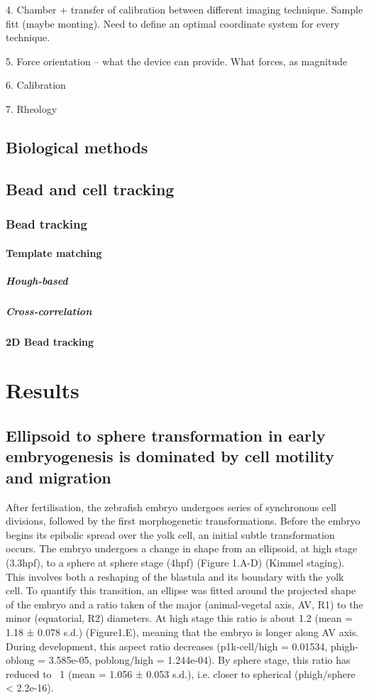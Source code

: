     4. Chamber + transfer of calibration between different imaging technique. Sample fitt (maybe monting). Need to define an optimal coordinate system for every technique.

    5. Force orientation – what the device can provide. What forces, as magnitude

    6. Calibration

    7. Rheology
  \fi
\subsection{Biological methods}
\subsection{Bead and cell tracking}
\subsubsection{Bead tracking}
\paragraph{Template matching}
\subparagraph{Hough-based}
\subparagraph{Cross-correlation}
\paragraph{2D Bead tracking}
\section{Results}

\subsection{Ellipsoid to sphere transformation in early embryogenesis is dominated by cell motility and migration}
After fertilisation, the zebrafish embryo undergoes series of synchronous cell divisions, followed by the first morphogenetic transformations.
Before the embryo begins its epibolic spread over the yolk cell, an initial subtle transformation occurs.
The embryo undergoes a change in shape from an ellipsoid, at high stage (3.3hpf), to a sphere at sphere stage (4hpf) (Figure 1.A-D) (Kimmel staging).
This involves both a reshaping of the blastula and its boundary with the yolk cell.
To quantify this transition, an ellipse was fitted around the projected shape of the embryo and a ratio taken of the major (animal-vegetal axis, AV, R1) to the minor (equatorial, R2) diameters.
At high stage this ratio is about 1.2 (mean = 1.18 ± 0.078 s.d.) (Figure1.E), meaning that the embryo is longer along AV axis.
During development, this aspect ratio decreases (p1k-cell/high = 0.01534, phigh-oblong = 3.585e-05, poblong/high = 1.244e-04).
By sphere stage, this ratio has reduced to ~1 (mean = 1.056 ± 0.053 s.d.), i.e. closer to spherical (phigh/sphere < 2.2e-16).

